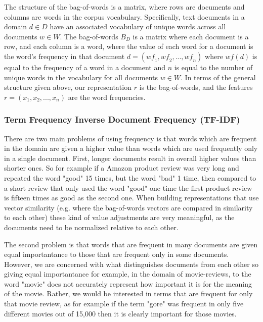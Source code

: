 The  structure of the bag-of-words is  a matrix, where rows are documents and columns are words in the corpus vocabulary. Specifically,  text documents in a domain $d \in D$ have an associated vocabulary of unique words across all documents $w \in W$. The bag-of-words $B_D$ is a matrix where each document is a row, and each column is a word, where the value of each word for a document is the word's frequency in that document $d = (\textit{wf}_1, \textit{wf}_2, ..., \textit{wf}_n)$ where ${wf}(d)$ is equal to the frequency of a word in a document and $n$ is equal to the number of unique words  in the vocabulary for all documents $w \in W$. In terms of the general structure given above, our representation $r$  is the bag-of-words, and the features $r = (x_1, x_2, ..., x_n)$ are the word frequencies.


\subsubsection{Term Frequency Inverse Document Frequency (TF-IDF)}

There are two main problems of using frequency is that words which are frequent in the domain are given a higher value than words which are used frequently only in a single document. First, longer documents result in overall higher values than shorter ones. So for example if a Amazon product review was very long and repeated the word "good" 15 times, but the word "bad" 1 time, then compared to a short review that only used the word "good" one time the first product review is fifteen times as good as the second one. When building representations that use vector similarity (e.g. where the bag-of-words vectors are compared in similarity to each other) these kind of value adjustments are very meaningful, as the documents need to be normalized relative to each other.


The second problem is that words that are frequent in many documents are given equal importantance to those that are frequent only in some documents. However, we are concerned with what distinguishes documents from each other so giving equal importantance  for example, in the domain of movie-reviews, to the word "movie" does not accurately represent how important it is for the meaning of the movie. Rather, we would be interested in terms that are frequent for only that movie review, as for example if the term "gore" was frequent in only five different movies out of 15,000 then it is clearly important for those movies. 


